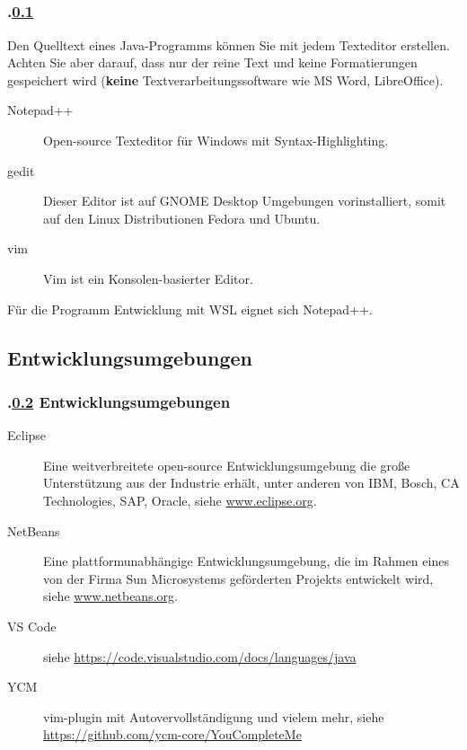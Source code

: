 \subsection{\stitle}\label{S:Editor}
\begin{frame}[t]%
  \frametitle{\kap.\ref{S:Editor} \stitle}%

Den Quelltext eines Java-Programms k\"onnen Sie mit jedem Texteditor erstellen.
Achten Sie aber darauf, dass nur der reine Text und keine Formatierungen gespeichert wird (\textbf{keine} Textverarbeitungssoftware wie MS Word, LibreOffice).
\vfill

\begin{description}
  \item[Notepad++] Open-source Texteditor f\"ur Windows mit Syntax-Highlighting.
\end{description}

\begin{description}
  \item[gedit] Dieser Editor ist auf GNOME Desktop Umgebungen vorinstalliert, somit auf den Linux Distributionen Fedora und Ubuntu.
  \item[vim] Vim ist ein Konsolen-basierter Editor.
\end{description}

\vfill
Für die Programm Entwicklung mit WSL eignet sich Notepad++.
\end{frame}


\def\stitle{Entwicklungsumgebungen}%
\subsection{\stitle}\label{S:IDE}
\begin{frame}[t]%
  \frametitle{\kap.\ref{S:IDE} \stitle}%


\begin{description}
  \item[Eclipse] Eine weitverbreitete open-source Entwicklungsumgebung die große Unterstützung aus der Industrie erhält, unter anderen von IBM, Bosch, CA Technologies, SAP, Oracle, siehe \textcolor{KITblue}{\url{www.eclipse.org}}.
  \item[NetBeans] Eine plattformunabh\"angige Entwicklungsumgebung, die im Rahmen eines von der Firma Sun Microsystems gef\"orderten Projekts entwickelt wird, siehe \textcolor{KITblue}{\url{www.netbeans.org}}.
  \item[VS Code] siehe \textcolor{KITblue}{\url{https://code.visualstudio.com/docs/languages/java}}
  \item[YCM] vim-plugin mit Autovervollständigung und vielem mehr, siehe \textcolor{KITblue}{\url{https://github.com/ycm-core/YouCompleteMe}}
\end{description}
\end{frame}
